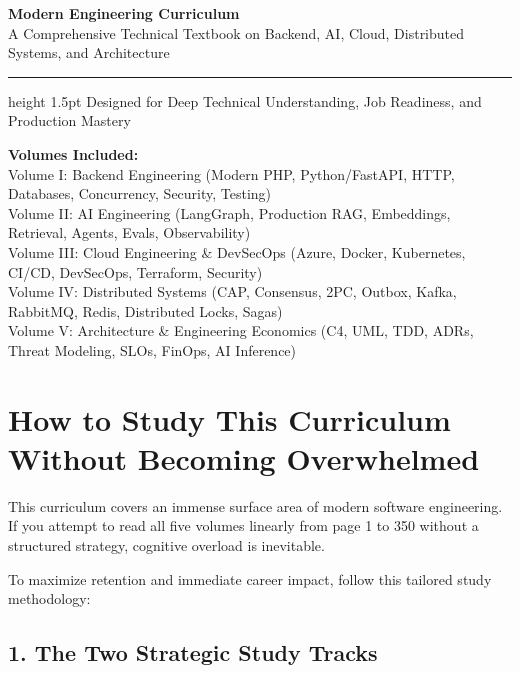 \documentclass[11pt,oneside]{book}
\begin{document}
\frontmatter

\begin{titlepage}
  \vspace*{2.5cm}
  {\Huge\sffamily\bfseries\color{headingblue} Modern Engineering Curriculum}\\[14pt]
  {\LARGE\sffamily\color{gray} A Comprehensive Technical Textbook on Backend, AI, Cloud, Distributed Systems, and Architecture}\\[28pt]
  \hrule height 1.5pt
  \vspace*{25pt}
  {\large\sffamily Designed for Deep Technical Understanding, Job Readiness, and Production Mastery}\\[3cm]
  
  \vfill
  \begin{flushleft}
    \sffamily\small
    \textbf{Volumes Included:}\\
    Volume I: Backend Engineering (Modern PHP, Python/FastAPI, HTTP, Databases, Concurrency, Security, Testing)\\
    Volume II: AI Engineering (LangGraph, Production RAG, Embeddings, Retrieval, Agents, Evals, Observability)\\
    Volume III: Cloud Engineering \& DevSecOps (Azure, Docker, Kubernetes, CI/CD, DevSecOps, Terraform, Security)\\
    Volume IV: Distributed Systems (CAP, Consensus, 2PC, Outbox, Kafka, RabbitMQ, Redis, Distributed Locks, Sagas)\\
    Volume V: Architecture \& Engineering Economics (C4, UML, TDD, ADRs, Threat Modeling, SLOs, FinOps, AI Inference)
  \end{flushleft}
\end{titlepage}

\chapter*{How to Study This Curriculum Without Becoming Overwhelmed}

This curriculum covers an immense surface area of modern software engineering. If you attempt to read all five volumes linearly from page 1 to 350 without a structured strategy, cognitive overload is inevitable. 

To maximize retention and immediate career impact, follow this tailored study methodology:

\section*{1. The Two Strategic Study Tracks}
\end{document}
